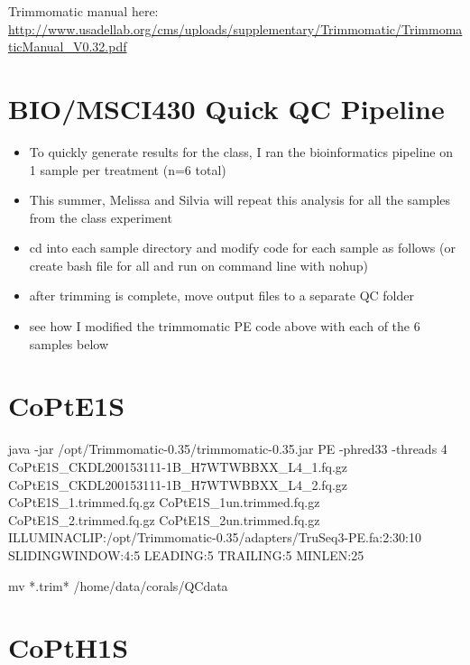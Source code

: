 \documentclass[]{article}
\newenvironment{Shaded}{\begin{snugshade}}{\end{snugshade}}
\newcommand{\ExtensionTok}[1]{#1}
\newcommand{\FunctionTok}[1]{\textcolor[rgb]{0.00,0.00,0.00}{#1}}
\newcommand{\NormalTok}[1]{#1}
\providecommand{\tightlist}{%
  \setlength{\itemsep}{0pt}\setlength{\parskip}{0pt}}
\begin{document}
Trimmomatic manual here:
\url{http://www.usadellab.org/cms/uploads/supplementary/Trimmomatic/TrimmomaticManual_V0.32.pdf}

\hypertarget{biomsci430-quick-qc-pipeline}{%
\section{BIO/MSCI430 Quick QC
Pipeline}\label{biomsci430-quick-qc-pipeline}}

\begin{itemize}
\tightlist
\item
  To quickly generate results for the class, I ran the bioinformatics
  pipeline on 1 sample per treatment (n=6 total)
\item
  This summer, Melissa and Silvia will repeat this analysis for all the
  samples from the class experiment
\item
  cd into each sample directory and modify code for each sample as
  follows (or create bash file for all and run on command line with
  nohup)
\item
  after trimming is complete, move output files to a separate QC folder
\item
  see how I modified the trimmomatic PE code above with each of the 6
  samples below
\end{itemize}

\hypertarget{copte1s}{%
\section{CoPtE1S}\label{copte1s}}

\begin{Shaded}
\begin{Highlighting}[]
\ExtensionTok{java}\NormalTok{ -jar /opt/Trimmomatic-0.35/trimmomatic-0.35.jar PE -phred33 -threads 4 CoPtE1S_CKDL200153111-1B_H7WTWBBXX_L4_1.fq.gz CoPtE1S_CKDL200153111-1B_H7WTWBBXX_L4_2.fq.gz CoPtE1S_1.trimmed.fq.gz CoPtE1S_1un.trimmed.fq.gz CoPtE1S_2.trimmed.fq.gz CoPtE1S_2un.trimmed.fq.gz ILLUMINACLIP:/opt/Trimmomatic-0.35/adapters/TruSeq3-PE.fa:2:30:10 SLIDINGWINDOW:4:5 LEADING:5 TRAILING:5 MINLEN:25}

\FunctionTok{mv}\NormalTok{ *.trim* /home/data/corals/QCdata}
\end{Highlighting}
\end{Shaded}

\hypertarget{copth1s}{%
\section{CoPtH1S}\label{copth1s}}
\end{document}
